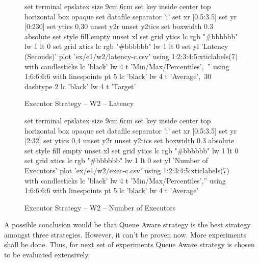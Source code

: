 \begin{figure}[H]
\begin{minipage}[h]{0.5\linewidth}
\begin{gnuplot}[terminal=epslatex, terminaloptions=color colortext]
			set terminal epslatex size 9cm,6cm
			set key inside center top horizontal box opaque
			set datafile separator ';'
			set xr [0.5:3.5]
			set yr [0:230]
			set ytics 0,30
            unset y2r
			unset y2tics
			set boxwidth 0.3 absolute
			set style fill empty
			unset xl
            set grid ytics lc rgb "#bbbbbb" lw 1 lt 0
            set grid xtics lc rgb "#bbbbbb" lw 1 lt 0
			set yl 'Latency (Seconds)'
			plot 'ex/e1/w2/latency-c.csv' using 1:2:3:4:5:xticlabels(7) with candlesticks lc 'black' lw 4 t 'Min/Max/Percentiles',\
			'' using 1:6:6:6:6 with linespoints pt 5 lc 'black' lw 4 t 'Average',\
            30 dashtype 2 lc 'black' lw 4 t 'Target'
		\end{gnuplot}
		\caption{Executor Strategy -- W2 -- Latency}
		\label{eval:f:e1:w2:lat-c}
	\end{minipage}\hfil
    \begin{minipage}[h]{0.5\linewidth}
        \centering
        \begin{gnuplot}[terminal=epslatex, terminaloptions=color colortext]
            set terminal epslatex size 9cm,6cm
            set key inside center top horizontal box opaque
            set datafile separator ';'
            set xr [0.5:3.5]
            set yr [2:32]
            set ytics 0,4
            unset y2r
            unset y2tics
            set boxwidth 0.3 absolute
            set style fill empty
            unset xl
            set grid ytics lc rgb "#bbbbbb" lw 1 lt 0
            set grid xtics lc rgb "#bbbbbb" lw 1 lt 0
            set yl 'Number of Executors'
            plot 'ex/e1/w2/exec-c.csv' using 1:2:3:4:5:xticlabels(7) with candlesticks lc 'black' lw 4 t 'Min/Max/Percentiles','' using 1:6:6:6:6 with linespoints pt 5 lc 'black' lw 4 t 'Average' 
        \end{gnuplot}
        \caption{Executor Strategy -- W2 -- Number of Executors}
        \label{eval:f:e1:w2:exec-c}
    \end{minipage}
\end{figure}
A possible conclusion would be that Queue Aware strategy is the best strategy amongst three strategies. However, it can't be proven now. More experiments shall be done. Thus, for next set of experiments Queue Aware strategy is chosen to be evaluated extensively.
\clearpage
